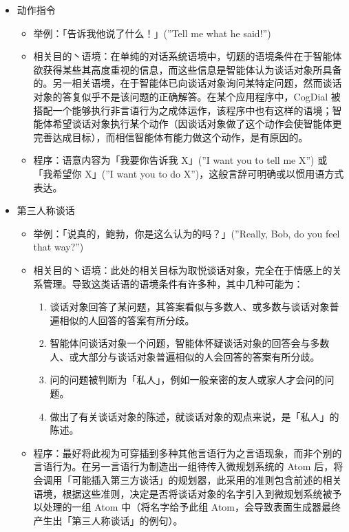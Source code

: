 \begin{itemize}
\item 动作指令
\begin{itemize}
\item 举例：「告诉我他说了什么！」(”Tell me what he said!”)
\item 相关目的丶语境：在单纯的对话系统语境中，切题的语境条件在于智能体欲获得某些其高度重视的信息，而这些信息是智能体认为谈话对象所具备的。另一相关语境，在于智能体已向谈话对象询问某特定问题，然而谈话对象的答复似乎不是该问题的正确解答。在某个应用程序中，CogDial 被搭配一个能够执行非言语行为之成体运作，该程序中也有这样的语境；智能体希望谈话对象执行某个动作（因谈话对象做了这个动作会使智能体更完善达成目标），而相信智能体有能力做这个动作，是有原因的。 
\item 程序：语意内容为「我要你告诉我 X」(”I want you to tell me X”) 或 「我希望你 X」(”I want you to do X”)，这般言辞可明确或以惯用语方式表达。
\end{itemize}


\item 第三人称谈话
\begin{itemize}
\item 举例：「说真的，鲍勃，你是这么认为的吗？」(”Really, Bob, do you feel that way?”)
\item 相关目的丶语境：此处的相关目标为取悦谈话对象，完全在于情感上的关系管理。导致这类话语的语境条件有许多种，其中几种可能为： 
\begin{enumerate}
\item 谈话对象回答了某问题，其答案看似与多数人、或多数与谈话对象普遍相似的人回答的答案有所分歧。
\item 智能体问谈话对象一个问题，智能体怀疑谈话对象的回答会与多数人、或大部分与谈话对象普遍相似的人会回答的答案有所分歧。 
\item 问的问题被判断为「私人」，例如一般亲密的友人或家人才会问的问题。
\item 做出了有关谈话对象的陈述，就谈话对象的观点来说，是「私人」的陈述。 
\end{enumerate}
\item 程序：最好将此视为可穿插到多种其他言语行为之言语现象，而非个别的言语行为。在另一言语行为制造出一组待传入微规划系统的 Atom 后，将会调用「可能插入第三方谈话」的规划器，此采用的准则包含前述的相关语境，根据这些准则，决定是否将谈话对象的名字引入到微规划系统被予以处理的一组 Atom 中（将名字给予此组 Atom，会导致表面生成器最终产生出「第三人称谈话」的例句）。

\end{itemize}
\end{itemize}


